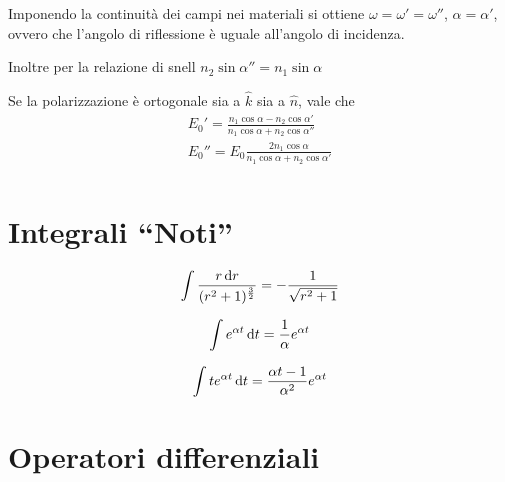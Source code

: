\documentclass[a4paper,10pt]{article}
\begin{document}
\begin{multicols}{2}
{  Imponendo la continuità dei campi nei materiali si ottiene $\omega =
  \omega' = \omega''$, $\alpha = \alpha'$, ovvero che l'angolo di
  riflessione è uguale all'angolo di incidenza.

  Inoltre per la relazione di snell
  $n_2 \sin \alpha'' = n_1 \sin \alpha$

  Se la polarizzazione è ortogonale sia a $\hat{k}$ sia a $\hat{n}$,
  vale che
  \begin{displaymath}
    \begin{array}{c}
      E_0' = \frac{n_1 \cos \alpha - n_2 \cos \alpha'}{n_1 \cos \alpha + n_2 \cos \alpha''} \\
      E_0'' = E_0 \frac{2 n_1 \cos \alpha}{n_1 \cos \alpha + n_2 \cos \alpha'}              \\
    \end{array}
  \end{displaymath}
}



\section{Integrali ``Noti''}
\begin{equation*}
  \int \frac{r \,\mathrm d r}{(r^2+1)^{\frac{3}{2}}} = - \frac{1}{\sqrt{r^2 + 1}}
\end{equation*}

\begin{equation*}
  \int e^{\alpha t} \,\mathrm d t = \frac{1}{\alpha} e^{\alpha t}
\end{equation*}

\begin{equation*}
  \int t e^{\alpha t} \,\mathrm d t = \frac{\alpha t - 1}{\alpha^2} e^{\alpha t}
\end{equation*}

\section{Operatori differenziali}


\end{multicols}
\end{document}
